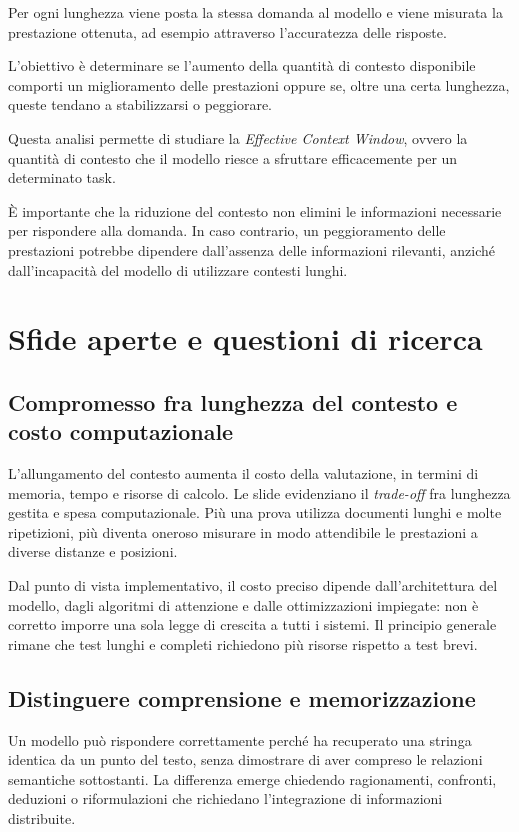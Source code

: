 Per ogni lunghezza viene posta la stessa domanda
al modello e viene misurata la prestazione ottenuta,
ad esempio attraverso l'accuratezza delle risposte.

L'obiettivo è determinare se l'aumento della
quantità di contesto disponibile comporti
un miglioramento delle prestazioni oppure se,
oltre una certa lunghezza, queste tendano
a stabilizzarsi o peggiorare.

Questa analisi permette di studiare la
\textit{Effective Context Window}, ovvero
la quantità di contesto che il modello riesce
a sfruttare efficacemente per un determinato task.

È importante che la riduzione del contesto
non elimini le informazioni necessarie per
rispondere alla domanda. In caso contrario,
un peggioramento delle prestazioni potrebbe
dipendere dall'assenza delle informazioni
rilevanti, anziché dall'incapacità del modello
di utilizzare contesti lunghi.


\section{Sfide aperte e questioni di ricerca}

\subsection{Compromesso fra lunghezza del contesto e costo computazionale}

L'allungamento del contesto aumenta il costo della valutazione, in termini di memoria, tempo e risorse di calcolo. Le slide evidenziano il \emph{trade-off} fra lunghezza gestita e spesa computazionale. Più una prova utilizza documenti lunghi e molte ripetizioni, più diventa oneroso misurare in modo attendibile le prestazioni a diverse distanze e posizioni.

Dal punto di vista implementativo, il costo preciso dipende dall'architettura del modello, dagli algoritmi di attenzione e dalle ottimizzazioni impiegate: non è corretto imporre una sola legge di crescita a tutti i sistemi. Il principio generale rimane che test lunghi e completi richiedono più risorse rispetto a test brevi.

\subsection{Distinguere comprensione e memorizzazione}

Un modello può rispondere correttamente perché ha recuperato una stringa identica da un punto del testo, senza dimostrare di aver compreso le relazioni semantiche sottostanti. La differenza emerge chiedendo ragionamenti, confronti, deduzioni o riformulazioni che richiedano l'integrazione di informazioni distribuite.


